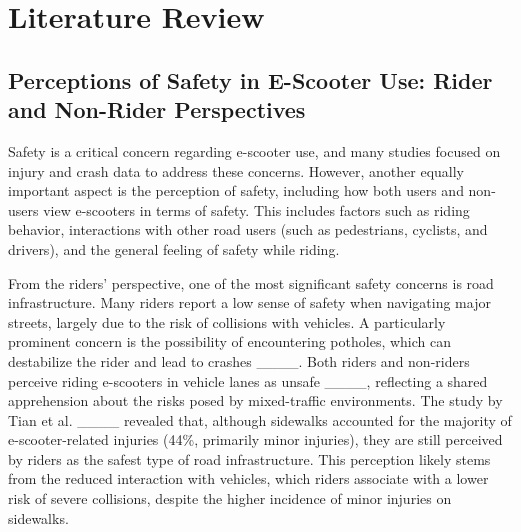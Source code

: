 \section{Literature Review}
\label{sec:literature}


\subsection{Perceptions of Safety in E-Scooter Use: Rider and Non-Rider Perspectives}
Safety is a critical concern regarding e-scooter use, and many studies focused on injury and crash data to address these concerns. However, another equally important aspect is the perception of safety, including how both users and non-users view e-scooters in terms of safety. This includes factors such as riding behavior, interactions with other road users (such as pedestrians, cyclists, and drivers), and the general feeling of safety while riding.

From the riders' perspective, one of the most significant safety concerns is road infrastructure. Many riders report a low sense of safety when navigating major streets, largely due to the risk of collisions with vehicles. A particularly prominent concern is the possibility of encountering potholes, which can destabilize the rider and lead to crashes ____. Both riders and non-riders perceive riding e-scooters in vehicle lanes as unsafe ____, reflecting a shared apprehension about the risks posed by mixed-traffic environments.
The study by Tian et al. ____ revealed that, although sidewalks accounted for the majority of e-scooter-related injuries (44\%, primarily minor injuries), they are still perceived by riders as the safest type of road infrastructure. This perception likely stems from the reduced interaction with vehicles, which riders associate with a lower risk of severe collisions, despite the higher incidence of minor injuries on sidewalks.

